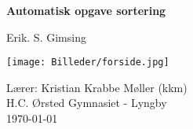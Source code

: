 
\begin{titlepage}
    \begin{center}
        \Huge
        \textbf{Automatisk opgave sortering}
        
        \vspace{0.5cm}
        \LARGE
        Erik. S. Gimsing
        
        \vspace{1cm}
        \texttt{[image: Billeder/forside.jpg]}
        \vspace{1cm}
        
        \Large
        Lærer: Kristian Krabbe Møller (kkm)\\
        H.C. Ørsted Gymnasiet - Lyngby\\
        \today
        
    \end{center}
\end{titlepage}

\tableofcontents
\pagebreak

